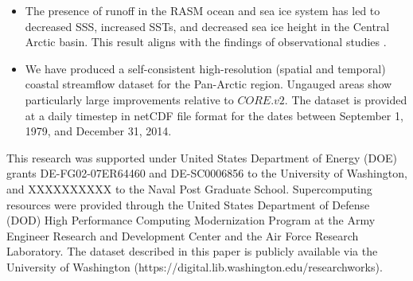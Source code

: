 \documentclass[jgrga, draft]{agutex}
\begin{document}
\begin{article}
\begin{itemize}[leftmargin=+.5in]
  \item The presence of runoff in the RASM ocean and sea ice system has led to decreased SSS, increased SSTs, and decreased sea ice height in the Central Arctic basin.
  This result aligns with the findings of observational studies \citep[e.g.][]{Morison_2012}.
  \item We have produced a self-consistent high-resolution (spatial and temporal) coastal streamflow dataset for the Pan-Arctic region.
  Ungauged areas show particularly large improvements relative to $CORE.v2$.
  The dataset is provided at a daily timestep in netCDF file format for the dates between September 1, 1979, and December 31, 2014.
\end{itemize}


%
%
%


\begin{acknowledgments}
This research was supported under United States Department of Energy (DOE) grants DE-FG02-07ER64460 and DE-SC0006856 to the University of Washington, and XXXXXXXXXX to the Naval Post Graduate School.
Supercomputing resources were provided through the United States Department of Defense (DOD) High Performance Computing Modernization Program at the Army Engineer Research and Development Center and the Air Force Research Laboratory.
The dataset described in this paper is publicly available via the University of Washington (https://digital.lib.washington.edu/researchworks).
\end{acknowledgments}





%
%
\end{article}
\end{document}
